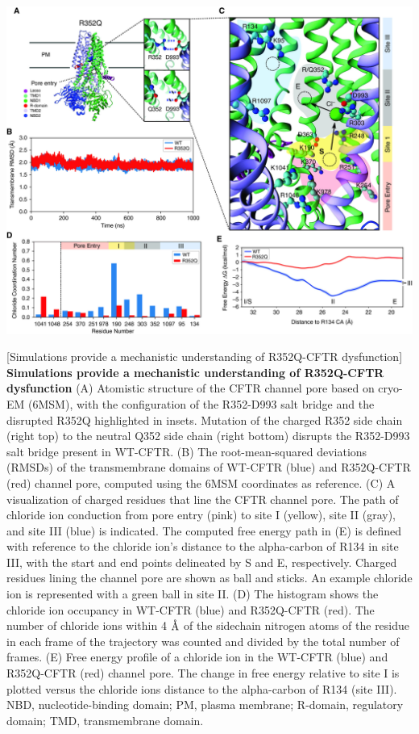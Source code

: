 \begin{center}
	\includegraphics[width=\textwidth]{figures/R352Q/figure_4.jpg}
\end{center}
	\captionsetup{singlelinecheck = false, justification=raggedright}
\begingroup
{}[Simulations provide a mechanistic understanding of R352Q-CFTR dysfunction] {\textbf{Simulations provide a mechanistic understanding of R352Q-CFTR dysfunction}}{ (A) Atomistic structure of the CFTR channel pore based on cryo-EM (6MSM), with the configuration of the R352-D993 salt bridge and the disrupted R352Q highlighted in insets. Mutation of the charged R352 side chain (right top) to the neutral Q352 side chain (right bottom) disrupts the R352-D993 salt bridge present in WT-CFTR. (B) The root-mean-squared deviations (RMSDs) of the transmembrane domains of WT-CFTR (blue) and R352Q-CFTR (red) channel pore, computed using the 6MSM coordinates as reference. (C) A visualization of charged residues that line the CFTR channel pore. The path of chloride ion conduction from pore entry (pink) to site I (yellow), site II (gray), and site III (blue) is indicated. The computed free energy path in (E) is defined with reference to the chloride ion’s distance to the alpha-carbon of R134 in site III, with the start and end points delineated by S and E, respectively. Charged residues lining the channel pore are shown as ball and sticks. An example chloride ion is represented with a green ball in site II. (D) The histogram shows the chloride ion occupancy in WT-CFTR (blue) and R352Q-CFTR (red). The number of chloride ions within 4 $\textup{\AA}$ of the sidechain nitrogen atoms of the residue in each frame of the trajectory was counted and divided by the total number of frames. (E) Free energy profile of a chloride ion in the WT-CFTR (blue) and R352Q-CFTR (red) channel pore. The change in free energy relative to site I is plotted versus the chloride ions distance to the alpha-carbon of R134 (site III). NBD, nucleotide-binding domain; PM, plasma membrane; R-domain, regulatory domain; TMD, transmembrane domain.}
\label{R352Q_figure_4}
\endgroup

